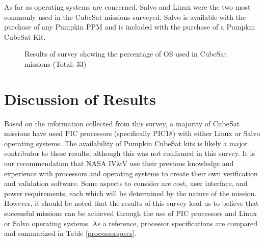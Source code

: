 \documentclass[11pt]{article}
\begin{document}
As far as operating systems are concerned, Salvo and Linux were the two most commonly used in the CubeSat missions surveyed.  Salvo is available with the purchase of any Pumpkin PPM and is included with the purchase of a Pumpkin CubeSat Kit.

\begin{figure}[ht!]
\centering
{}
\caption{Results of survey showing the percentage of OS used in CubeSat missions (Total: 33)}
\label{OS}
\end{figure}

\section{Discussion of Results}
Based on the information collected from this survey, a majority of CubeSat missions have used PIC processors (specifically PIC18) with either Linux or Salvo operating systems.  The availability of Pumpkin CubeSat kits is likely a major contributor to these results, although this was not confirmed in this survey.  It is our recommendation that NASA IV\&V use their previous knowledge and experience with processors and operating systems to create their own verification and validation software.  Some aspects to consider are cost, user interface, and power requirements, each which will be determined by the nature of the mission.  However, it should be noted that the results of this survey lead us to believe that successful missions can be achieved through the use of PIC processors and Linux or Salvo operating systems.  As a reference, processor specifications are compared and summarized in Table \ref{processorspecs}.  
\end{document}
